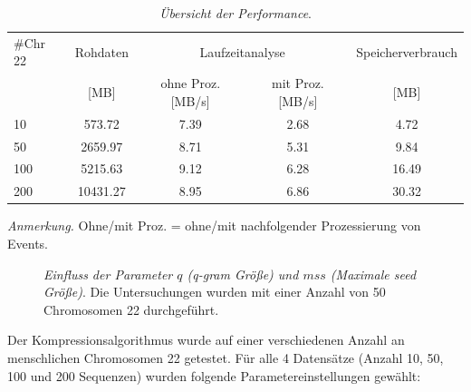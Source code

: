 \documentclass[12pt]{article}
\newenvironment{tightcenter}{%
  \setlength\topsep{0pt}
  \setlength\parskip{0pt}
  \begin{center}
}{%
  \end{center}
}
\begin{document}
\begin{table}[t]
\caption{\label{tab:runtime}\emph{Übersicht der Performance}.}
\small
\begin{tightcenter}
\begin{tabular}{lcccc}
	\toprule
	$\#$Chr 22 & Rohdaten & \multicolumn{2}{c}{Laufzeitanalyse} & Speicherverbrauch\\
               & \tiny[MB]     & ohne Proz.\tiny[MB/s] & mit Proz.\tiny[MB/s]            & \tiny[MB] \\
	\midrule
	10  &  573.72  & 7.39 & 2.68 & 4.72\\
	50  & 2659.97  & 8.71 & 5.31 & 9.84\\
	100 & 5215.63  & 9.12 & 6.28 & 16.49\\
	200 & 10431.27 & 8.95 & 6.86 & 30.32\\
	\bottomrule
\end{tabular}
\end{tightcenter}
\begin{tablenotes}
	\small \centering
	\item \emph{Anmerkung.} Ohne/mit Proz. = ohne/mit nachfolgender Prozessierung von Events.
\end{tablenotes}
\end{table}

\begin{figure}[h]
\caption{\label{fig:param}\footnotesize \emph{Einfluss der Parameter $q$ (q-gram Größe) und $mss$ (Maximale \textit{seed} Größe)}. Die Untersuchungen wurden mit einer Anzahl von 50 Chromosomen 22 durchgeführt.}
\end{figure}


Der Kompressionsalgorithmus wurde auf einer verschiedenen Anzahl an menschlichen Chromosomen 22 getestet. Für alle 4 Datensätze (Anzahl 10, 50, 100 und 200 Sequenzen) wurden folgende Parametereinstellungen gewählt:\\
\end{document}
